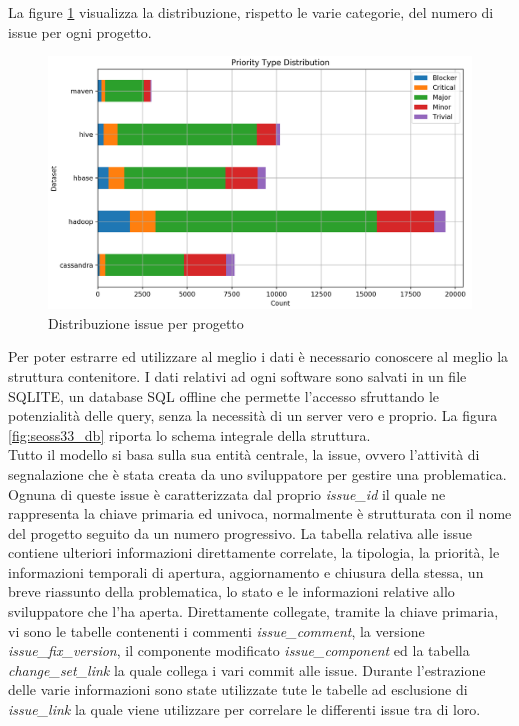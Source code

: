 \documentclass[%
    corpo=12pt,
    twoside,
    oldstyle,
    autoretitolo,
    greek,
    evenboxes,
]{toptesi}
\begin{document}
La figure \ref{fig:prior} visualizza la distribuzione, rispetto le varie categorie, del numero di issue per ogni progetto.
\begin{figure}[!ht]
  \includegraphics[width=\linewidth]{figure/prior.png}
  \caption{Distribuzione issue per progetto}
  \label{fig:prior}
\end{figure}
Per poter estrarre ed utilizzare al meglio i dati è necessario conoscere al meglio la struttura contenitore.
I dati relativi ad ogni software sono salvati in un file SQLITE, un database SQL offline che permette l'accesso sfruttando le potenzialità delle query, senza la necessità di un server vero e proprio. La figura \ref{fig:seoss33_db} riporta lo schema integrale della struttura.\\
Tutto il modello si basa sulla sua entità centrale, la issue, ovvero l'attività di segnalazione che è stata creata da uno sviluppatore per gestire una problematica. Ognuna di queste issue è caratterizzata dal proprio \textit{issue\_id} il quale ne rappresenta la chiave primaria ed univoca, normalmente è strutturata con il nome del progetto seguito da un numero progressivo. La tabella relativa alle issue contiene ulteriori informazioni direttamente correlate, la tipologia, la priorità, le informazioni temporali di apertura, aggiornamento e chiusura della stessa, un breve riassunto della problematica, lo stato e le informazioni relative allo sviluppatore che l'ha aperta. Direttamente collegate, tramite la chiave primaria, vi sono le tabelle contenenti i commenti \textit{issue\_comment}, la versione \textit{issue\_fix\_version}, il componente modificato \textit{issue\_component} ed la tabella \textit{change\_set\_link} la quale collega i vari commit alle issue. Durante l'estrazione delle varie informazioni sono state utilizzate tute le tabelle ad esclusione di \textit{issue\_link} la quale viene utilizzare per correlare le differenti issue tra di loro.
\end{document}
